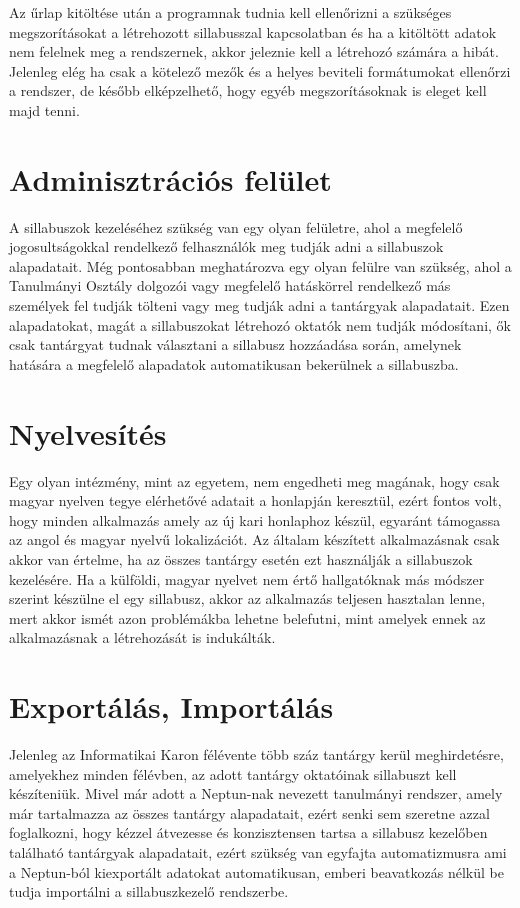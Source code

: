 \documentclass[hidelinks, 12pt, a4paper]{report}
\begin{document}
Az űrlap kitöltése után a programnak tudnia kell ellenőrizni a szükséges megszorításokat a létrehozott sillabusszal kapcsolatban és ha a kitöltött adatok nem felelnek meg a rendszernek, akkor jeleznie kell a létrehozó számára a hibát. Jelenleg elég ha csak a kötelező mezők és a helyes beviteli formátumokat ellenőrzi a rendszer, de később elképzelhető, hogy egyéb megszorításoknak is eleget kell majd tenni.

\section{Adminisztrációs felület}

A sillabuszok kezeléséhez szükség van egy olyan felületre, ahol a megfelelő jogosultságokkal rendelkező felhasználók meg tudják adni a sillabuszok alapadatait. Még pontosabban meghatározva egy olyan felülre van szükség, ahol a Tanulmányi Osztály dolgozói vagy megfelelő hatáskörrel rendelkező más személyek fel tudják tölteni vagy meg tudják adni a tantárgyak alapadatait. Ezen alapadatokat, magát a sillabuszokat létrehozó oktatók nem tudják módosítani, ők csak tantárgyat tudnak választani a sillabusz hozzáadása során, amelynek hatására a megfelelő alapadatok automatikusan bekerülnek a sillabuszba.

\section{Nyelvesítés}

Egy olyan intézmény, mint az egyetem, nem engedheti meg magának, hogy csak magyar nyelven tegye elérhetővé adatait a honlapján keresztül, ezért fontos volt, hogy minden alkalmazás amely az új kari honlaphoz készül, egyaránt támogassa az angol és magyar nyelvű lokalizációt. Az általam készített alkalmazásnak csak akkor van értelme, ha az összes tantárgy esetén ezt használják a sillabuszok kezelésére. Ha a külföldi, magyar nyelvet nem értő hallgatóknak más módszer szerint készülne el egy sillabusz, akkor az alkalmazás teljesen hasztalan lenne, mert akkor ismét azon problémákba lehetne belefutni, mint amelyek ennek az alkalmazásnak a létrehozását is indukálták.

\section{Exportálás, Importálás}

Jelenleg az Informatikai Karon félévente több száz tantárgy kerül meghirdetésre, amelyekhez minden félévben, az adott tantárgy oktatóinak sillabuszt kell készíteniük. Mivel már adott a Neptun-nak nevezett tanulmányi rendszer, amely már tartalmazza az összes tantárgy alapadatait, ezért senki sem szeretne azzal foglalkozni, hogy kézzel átvezesse és konzisztensen tartsa a sillabusz kezelőben található tantárgyak alapadatait, ezért szükség van egyfajta automatizmusra ami a Neptun-ból kiexportált adatokat automatikusan, emberi beavatkozás nélkül be tudja importálni a sillabuszkezelő rendszerbe.
\end{document}
